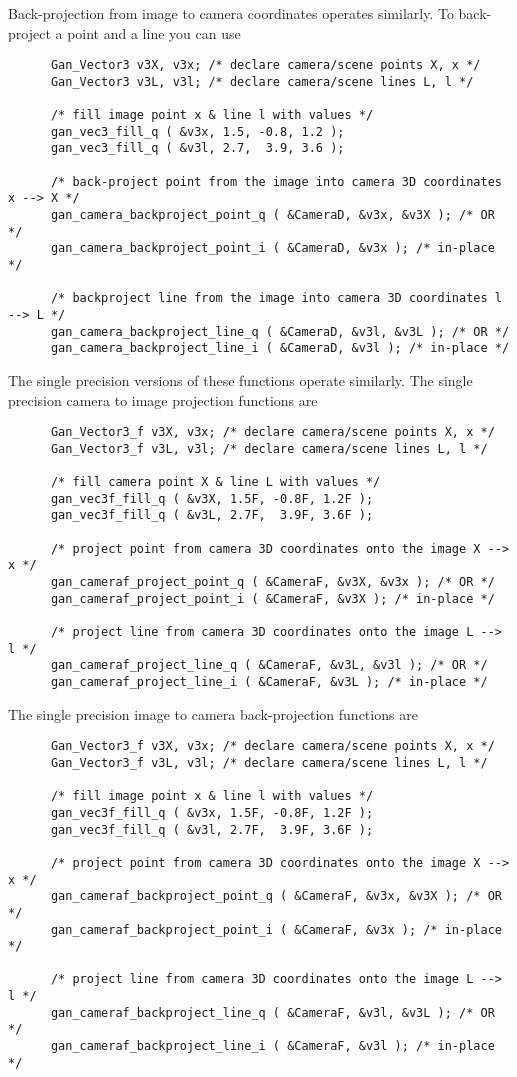 Back-projection from image to camera coordinates operates similarly.
To back-project a point and a line you can use
\begin{verbatim}
      Gan_Vector3 v3X, v3x; /* declare camera/scene points X, x */
      Gan_Vector3 v3L, v3l; /* declare camera/scene lines L, l */

      /* fill image point x & line l with values */
      gan_vec3_fill_q ( &v3x, 1.5, -0.8, 1.2 );
      gan_vec3_fill_q ( &v3l, 2.7,  3.9, 3.6 );

      /* back-project point from the image into camera 3D coordinates x --> X */
      gan_camera_backproject_point_q ( &CameraD, &v3x, &v3X ); /* OR */
      gan_camera_backproject_point_i ( &CameraD, &v3x ); /* in-place */

      /* backproject line from the image into camera 3D coordinates l --> L */
      gan_camera_backproject_line_q ( &CameraD, &v3l, &v3L ); /* OR */
      gan_camera_backproject_line_i ( &CameraD, &v3l ); /* in-place */
\end{verbatim}

The single precision versions of these functions operate similarly.
The single precision camera to image projection functions are
\begin{verbatim}
      Gan_Vector3_f v3X, v3x; /* declare camera/scene points X, x */
      Gan_Vector3_f v3L, v3l; /* declare camera/scene lines L, l */

      /* fill camera point X & line L with values */
      gan_vec3f_fill_q ( &v3X, 1.5F, -0.8F, 1.2F );
      gan_vec3f_fill_q ( &v3L, 2.7F,  3.9F, 3.6F );

      /* project point from camera 3D coordinates onto the image X --> x */
      gan_cameraf_project_point_q ( &CameraF, &v3X, &v3x ); /* OR */
      gan_cameraf_project_point_i ( &CameraF, &v3X ); /* in-place */

      /* project line from camera 3D coordinates onto the image L --> l */
      gan_cameraf_project_line_q ( &CameraF, &v3L, &v3l ); /* OR */
      gan_cameraf_project_line_i ( &CameraF, &v3L ); /* in-place */
\end{verbatim}
The single precision image to camera back-projection functions are
\begin{verbatim}
      Gan_Vector3_f v3X, v3x; /* declare camera/scene points X, x */
      Gan_Vector3_f v3L, v3l; /* declare camera/scene lines L, l */

      /* fill image point x & line l with values */
      gan_vec3f_fill_q ( &v3x, 1.5F, -0.8F, 1.2F );
      gan_vec3f_fill_q ( &v3l, 2.7F,  3.9F, 3.6F );

      /* project point from camera 3D coordinates onto the image X --> x */
      gan_cameraf_backproject_point_q ( &CameraF, &v3x, &v3X ); /* OR */
      gan_cameraf_backproject_point_i ( &CameraF, &v3x ); /* in-place */

      /* project line from camera 3D coordinates onto the image L --> l */
      gan_cameraf_backproject_line_q ( &CameraF, &v3l, &v3L ); /* OR */
      gan_cameraf_backproject_line_i ( &CameraF, &v3l ); /* in-place */
\end{verbatim}


